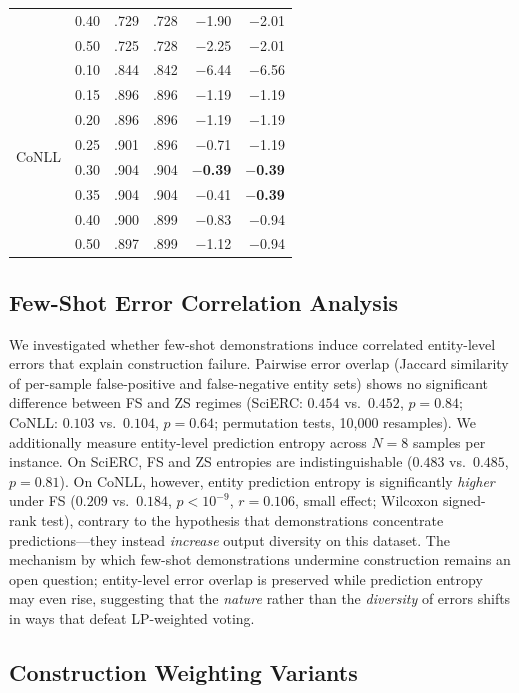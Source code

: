 \begin{table}[h]
{\begin{tabular}{ll rr rr}
 & 0.40 & .729 & .728 & $-$1.90 & $-$2.01 \\
 & 0.50 & .725 & .728 & $-$2.25 & $-$2.01 \\
\midrule
\multirow{8}{*}{CoNLL}
 & 0.10 & .844 & .842 & $-$6.44 & $-$6.56 \\
 & 0.15 & .896 & .896 & $-$1.19 & $-$1.19 \\
 & 0.20 & .896 & .896 & $-$1.19 & $-$1.19 \\
 & 0.25 & .901 & .896 & $-$0.71 & $-$1.19 \\
 & 0.30 & .904 & .904 & \textbf{$-$0.39} & \textbf{$-$0.39} \\
 & 0.35 & .904 & .904 & $-$0.41 & \textbf{$-$0.39} \\
 & 0.40 & .900 & .899 & $-$0.83 & $-$0.94 \\
 & 0.50 & .897 & .899 & $-$1.12 & $-$0.94 \\
\bottomrule
\end{tabular}
}
\end{table}

\subsection{Few-Shot Error Correlation Analysis}\label{app:fs_error}

We investigated whether few-shot demonstrations induce correlated entity-level errors that explain construction failure.
Pairwise error overlap (Jaccard similarity of per-sample false-positive and false-negative entity sets) shows no significant difference between FS and ZS regimes (SciERC: $0.454$ vs.\ $0.452$, $p{=}0.84$; CoNLL: $0.103$ vs.\ $0.104$, $p{=}0.64$; permutation tests, 10{,}000 resamples).
We additionally measure entity-level prediction entropy across $N{=}8$ samples per instance.
On SciERC, FS and ZS entropies are indistinguishable ($0.483$ vs.\ $0.485$, $p{=}0.81$).
On CoNLL, however, entity prediction entropy is significantly \emph{higher} under FS ($0.209$ vs.\ $0.184$, $p{<}10^{-9}$, $r{=}0.106$, small effect; Wilcoxon signed-rank test), contrary to the hypothesis that demonstrations concentrate predictions---they instead \emph{increase} output diversity on this dataset.
The mechanism by which few-shot demonstrations undermine construction remains an open question; entity-level error overlap is preserved while prediction entropy may even rise, suggesting that the \emph{nature} rather than the \emph{diversity} of errors shifts in ways that defeat LP-weighted voting.

\subsection{Construction Weighting Variants}\label{app:weighting_variants}

